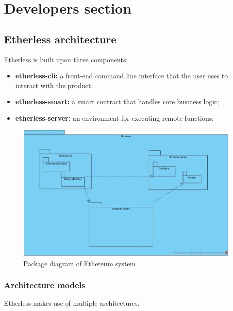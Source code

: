 \section{Developers section}
\subsection{Etherless architecture}
Etherless is built upon three components:
\begin{itemize}
	\item \textbf{etherless-cli:} a front-end command line interface that the user uses to interact with the product;
	\item \textbf{etherless-smart:} a smart contract that handles core business logic;
	\item \textbf{etherless-server:} an environment for executing remote functions;
\end{itemize}
\begin{figure}
	\centering
	\includegraphics[width=\textwidth]{res/img/packageDiagram.jpg}
	\caption{Package diagram of Ethereum system}
\end{figure}
\subsubsection{Architecture models}
Etherless makes use of multiple architectures.
